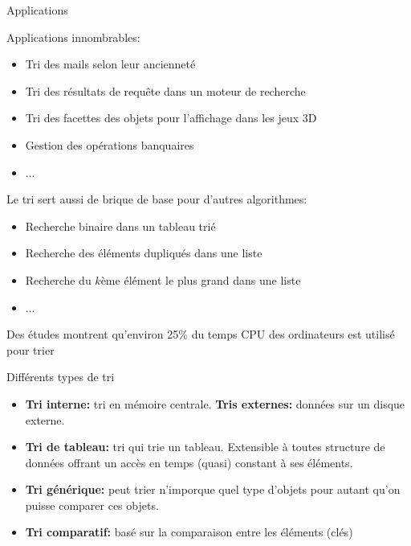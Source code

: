 \begin{frame}{Applications}

Applications innombrables:
\begin{itemize}
\item Tri des mails selon leur ancienneté
\item Tri des résultats de requête dans un moteur de recherche
\item Tri des facettes des objets pour l'affichage dans les jeux 3D
\item Gestion des opérations banquaires
\item ...
\end{itemize}

\bigskip

Le tri sert aussi de brique de base pour d'autres algorithmes:
\begin{itemize}
\item Recherche binaire dans un tableau trié
\item Recherche des éléments dupliqués dans une liste
\item Recherche du $k$ème élément le plus grand dans une liste
\item ...
\end{itemize}

\bigskip

Des études montrent qu'environ 25\% du temps CPU des ordinateurs est utilisé pour trier
\end{frame}

\begin{frame}{Différents types de tri}

\begin{itemize}
\item {\bf Tri interne:} tri en mémoire centrale. {\bf Tris externes:} données sur un disque externe.
\item {\bf Tri de tableau:} tri qui trie un tableau. Extensible à toutes structure de données offrant un accès en temps (quasi) constant à ses éléments.
\item {\bf Tri générique:} peut trier n'imporque quel type d'objets pour autant qu'on puisse comparer ces objets.
\item {\bf Tri comparatif:} basé sur la comparaison entre les éléments (clés)

\end{itemize}

\end{frame}

